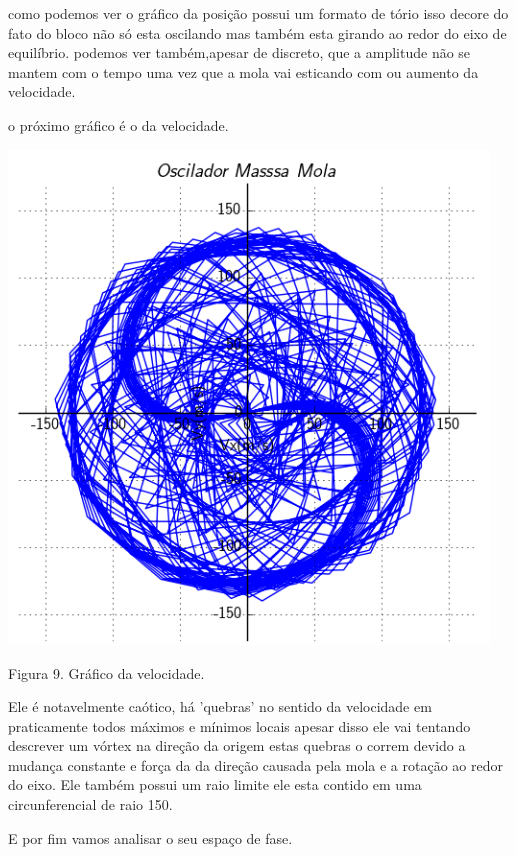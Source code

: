 \documentclass[a4paper]{article} %
\begin{document}
como podemos ver o gráfico da posição possui um formato de tório isso decore do fato do bloco não só esta oscilando mas também esta girando ao redor do eixo de equilíbrio. podemos ver também,apesar de discreto, que a amplitude não se mantem com o tempo uma vez que a mola vai esticando com ou aumento da velocidade.

o próximo gráfico é o da velocidade.
\vspace{1cm}
\begin{center}
	\includegraphics[width=5.02in,height=5.16in, keepaspectratio=false]{penMassaMolaVxy.png}
	
	\scriptsize {Figura 9. Gráfico da velocidade.}
\end{center}

Ele é notavelmente caótico, há 'quebras' no sentido da velocidade em praticamente todos máximos e mínimos locais apesar disso ele vai tentando descrever um vórtex na direção da origem  estas quebras o correm devido a mudança constante e  força da da direção causada pela mola e a rotação ao redor do eixo. Ele também possui um raio limite ele esta contido em uma circunferencial de raio 150.

E por fim vamos analisar o seu espaço de fase.
\end{document}
